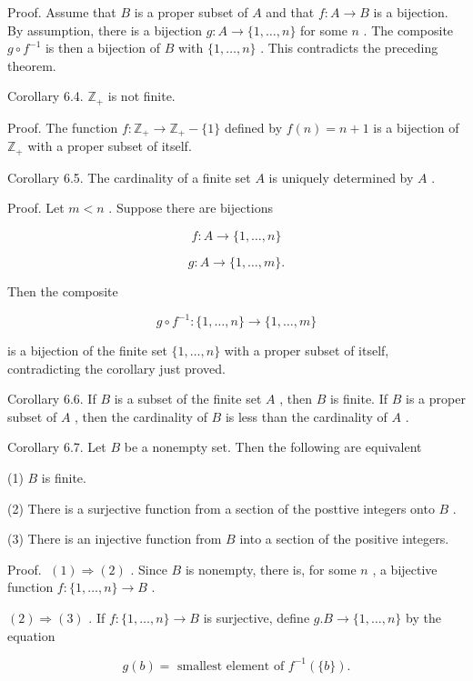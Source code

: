 \documentclass[10pt]{article}
\begin{document}
Proof. Assume that \(B\) is a proper subset of \(A\) and that \(f : A \rightarrow  B\) is a bijection. By assumption, there is a bijection \(g : A \rightarrow  \{ 1,\ldots ,n\}\) for some \(n\) . The composite \(g \circ  {f}^{-1}\) is then a bijection of \(B\) with \(\{ 1,\ldots ,n\}\) . This contradicts the preceding theorem.

Corollary 6.4. \({\mathbb{Z}}_{ + }\) is not finite.

Proof. The function \(f : {\mathbb{Z}}_{ + } \rightarrow  {\mathbb{Z}}_{ + } - \{ 1\}\) defined by \(f\left( n\right)  = n + 1\) is a bijection of \({\mathbb{Z}}_{ + }\) with a proper subset of itself.

Corollary 6.5. The cardinality of a finite set \(A\) is uniquely determined by \(A\) .

Proof. Let \(m < n\) . Suppose there are bijections

\[
f : A \rightarrow  \{ 1,\ldots ,n\}
\]

\[
g : A \rightarrow  \{ 1,\ldots ,m\} .
\]

Then the composite

\[
g \circ  {f}^{-1} : \{ 1,\ldots ,n\}  \rightarrow  \{ 1,\ldots ,m\}
\]

is a bijection of the finite set \(\{ 1,\ldots ,n\}\) with a proper subset of itself, contradicting the corollary just proved.

Corollary 6.6. If \(B\) is a subset of the finite set \(A\) , then \(B\) is finite. If \(B\) is a proper subset of \(A\) , then the cardinality of \(B\) is less than the cardinality of \(A\) .

Corollary 6.7. Let \(B\) be a nonempty set. Then the following are equivalent

(1) \(B\) is finite.

(2) There is a surjective function from a section of the posttive integers onto \(B\) .

(3) There is an injective function from \(B\) into a section of the positive integers.

Proof. \(\;\left( 1\right)  \Rightarrow  \left( 2\right)\) . Since \(B\) is nonempty, there is, for some \(n\) , a bijective function \(f : \{ 1,\ldots ,n\}  \rightarrow  B\) .

\(\left( 2\right)  \Rightarrow  \left( 3\right)\) . If \(f : \{ 1,\ldots ,n\}  \rightarrow  B\) is surjective, define \(g.B \rightarrow  \{ 1,\ldots ,n\}\) by the equation

\[
g\left( b\right)  = \text{ smallest element of }{f}^{-1}\left( {\{ b\} }\right) .
\]
\end{document}
